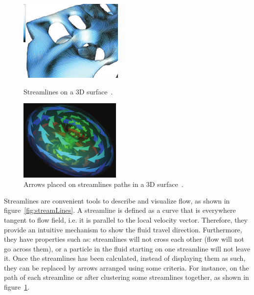 \begin{figure}[h]
	\centering
	\begin{minipage}[t]{.45\textwidth}
		\centering
		\includegraphics[width=.8\textwidth,height=4cm]{images/streamLinesSpencer}
		\caption{Streamlines on a 3D surface~\cite{Spencer2009}.}
		\label{fig:streamLines}
	\end{minipage}\hfill
	\begin{minipage}[t]{.45\textwidth}
		\centering
		\includegraphics[width=.8\textwidth,height=4cm]{images/streamArrows}
		\caption{Arrows placed on streamlines paths in a 3D surface~\cite{loffelmann1998}.}
		\label{fig:streamArrows}
	\end{minipage}
\end{figure}

Streamlines are convenient tools to describe and visualize flow, as shown in figure~\ref{fig:streamLines}.
A streamline is defined as a curve that is everywhere tangent to flow field, i.e. it is parallel to the local velocity vector.
Therefore, they provide an intuitive mechanism to show the fluid travel direction.
Furthermore, they have properties such as: streamlines will not cross each other (flow will not go across them), or a particle in the fluid starting on one streamline will not leave it.
Once the streamlines has been calculated, instead of displaying them as such, they can be replaced by arrows arranged using some criteria.
For instance, on the path of each streamline or after clustering some streamlines together, as shown in figure~\ref{fig:streamArrows}.\\

